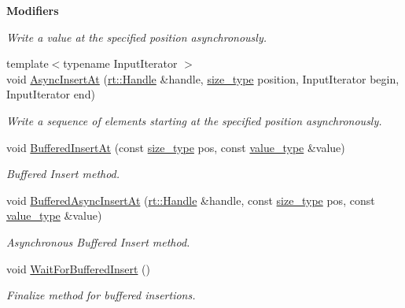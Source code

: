 \begin{Indent}{\bf Modifiers}
\begin{DoxyCompactItemize}
\begin{DoxyCompactList}\small\item\em Write a value at the specified position asynchronously. \end{DoxyCompactList}\item 
{\footnotesize template$<$typename Input\-Iterator $>$ }\\void \hyperlink{classshad_1_1Vector_ac1b10512407484abb67858dee56f5a40}{Async\-Insert\-At} (\hyperlink{classshad_1_1rt_1_1Handle}{rt\-::\-Handle} \&handle, \hyperlink{classshad_1_1Vector_a1c97f4eb87d738cb4de97e5b3587c397}{size\-\_\-type} position, Input\-Iterator begin, Input\-Iterator end)
\begin{DoxyCompactList}\small\item\em Write a sequence of elements starting at the specified position asynchronously. \end{DoxyCompactList}\item 
void \hyperlink{classshad_1_1Vector_a20c0f9b4e66907b236e866e86f438184}{Buffered\-Insert\-At} (const \hyperlink{classshad_1_1Vector_a1c97f4eb87d738cb4de97e5b3587c397}{size\-\_\-type} pos, const \hyperlink{classshad_1_1Vector_adb97b89826617473f44b4bb1dd3308ba}{value\-\_\-type} \&value)
\begin{DoxyCompactList}\small\item\em Buffered Insert method. \end{DoxyCompactList}\item 
void \hyperlink{classshad_1_1Vector_a1b89dc4cb141559dfcfaa3f42bfe56d6}{Buffered\-Async\-Insert\-At} (\hyperlink{classshad_1_1rt_1_1Handle}{rt\-::\-Handle} \&handle, const \hyperlink{classshad_1_1Vector_a1c97f4eb87d738cb4de97e5b3587c397}{size\-\_\-type} pos, const \hyperlink{classshad_1_1Vector_adb97b89826617473f44b4bb1dd3308ba}{value\-\_\-type} \&value)
\begin{DoxyCompactList}\small\item\em Asynchronous Buffered Insert method. \end{DoxyCompactList}\item 
void \hyperlink{classshad_1_1Vector_ad82b288c5e4fe984bbb7093ce2dfde0d}{Wait\-For\-Buffered\-Insert} ()
\begin{DoxyCompactList}\small\item\em Finalize method for buffered insertions. \end{DoxyCompactList}\end{DoxyCompactItemize}
\end{Indent}
